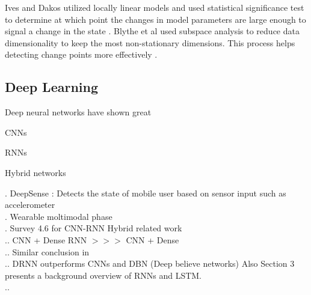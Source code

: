 Ives and Dakos utilized locally linear models and used statistical significance test to determine at which point the changes in model parameters are large enough to signal a change in the state \cite{Ives2012}. Blythe et al used subspace analysis to reduce data dimensionality to keep the most non-stationary dimensions. This process helps detecting change points more effectively \cite{Blythe2012}. 



\subsection{Deep Learning}
Deep neural networks have shown great 

CNNs

RNNs

Hybrid networks

. DeepSense \cite{deepsense}: Detects the state of mobile user based on sensor input such as accelerometer  \\
. Wearable moltimodal phase \cite{Ordonez2016}\\
. Survey \cite{wang2019deep} 4.6 for CNN-RNN Hybrid related work\\
.. CNN + Dense RNN $>>>$ CNN + Dense \cite{morales2016deep}\\
.. Similar conclusion in \cite{singh2017transforming}\\
.. DRNN outperforms CNNs and DBN (Deep believe networks) \cite{murad2017deep} Also Section 3 presents a background overview of RNNs and LSTM.\\
.. \cite{zheng2016exploiting}\\
